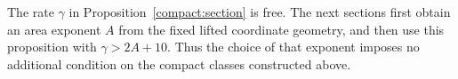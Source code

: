 The rate $\gamma$ in Proposition~\ref{compact:section} is free. The
next sections first obtain an area exponent $A$ from the fixed lifted
coordinate geometry, and then use this proposition with
$\gamma>2A+10$. Thus the choice of that exponent imposes no additional
condition on the compact classes constructed above.
